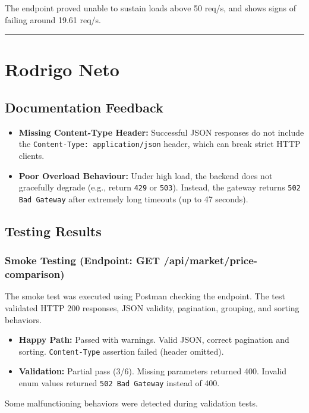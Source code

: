 \documentclass[11pt,a4paper]{article}
\begin{document}
The endpoint proved unable to sustain loads above 50 req/s, and shows signs of failing around 19.61 req/s.

\vspace{1cm}
\hrule
\vspace{1cm}


\section*{Rodrigo Neto}

\subsection*{Documentation Feedback}
\begin{itemize}
    \item \textbf{Missing Content-Type Header:} Successful JSON responses do not include the \texttt{Content-Type: application/json} header, which can break strict HTTP clients.
    \item \textbf{Poor Overload Behaviour:} Under high load, the backend does not gracefully degrade (e.g., return \texttt{429} or \texttt{503}). Instead, the gateway returns \texttt{502 Bad Gateway} after extremely long timeouts (up to 47 seconds).
\end{itemize}

\subsection*{Testing Results}

\subsubsection*{Smoke Testing (Endpoint: GET /api/market/price-comparison)}
The smoke test was executed using Postman checking the endpoint. The test validated HTTP 200 responses, JSON validity, pagination, grouping, and sorting behaviors.
\begin{itemize}
    \item \textbf{Happy Path:} Passed with warnings. Valid JSON, correct pagination and sorting. \texttt{Content-Type} assertion failed (header omitted).
    \item \textbf{Validation:} Partial pass (3/6). Missing parameters returned 400. Invalid enum values returned \texttt{502 Bad Gateway} instead of 400.
\end{itemize}
Some malfunctioning behaviors were detected during validation tests.
\end{document}
